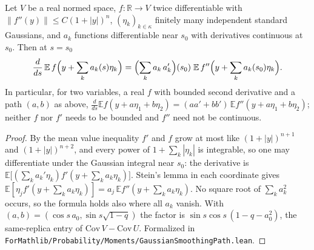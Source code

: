 \begin{lemma}\label{lem:sg-tal:perceptron-smoothing-path}
  \leanok
Let $V$ be a real normed space, $f:\mathbb R\to V$ twice differentiable with $\|f''(y)\|\le C(1+|y|)^n$,
$(\eta_k)_{k\in\kappa}$ finitely many independent standard Gaussians, and $a_k$ functions differentiable near $s_0$
with derivatives continuous at $s_0$. Then at $s=s_0$
\[
 \frac d{ds}\,\mathbb E\,f\Bigl(y+\sum_ka_k(s)\eta_k\Bigr)
 =\Bigl(\sum_ka_k\,a_k'\Bigr)(s_0)\;\mathbb E\,f''\Bigl(y+\sum_ka_k(s_0)\eta_k\Bigr).
\]
In particular, for two variables, a real $f$ with bounded second derivative and a path $(a,b)$ as above,
$\frac d{ds}\mathbb Ef(y+a\eta_1+b\eta_2)=(aa'+bb')\,\mathbb Ef''(y+a\eta_1+b\eta_2)$; neither $f$ nor $f'$ needs to
be bounded and $f''$ need not be continuous.
\end{lemma}
\begin{proof}
  \leanok
By the mean value inequality $f'$ and $f$ grow at most like $(1+|y|)^{n+1}$ and $(1+|y|)^{n+2}$, and every power of
$1+\sum_k|\eta_k|$ is integrable, so one may differentiate under the Gaussian integral near $s_0$:
the derivative is $\mathbb E\bigl[(\sum_ka_k'\eta_k)f'(y+\sum_ka_k\eta_k)\bigr]$. Stein's lemma in each coordinate
gives $\mathbb E[\eta_jf'(y+\sum_ka_k\eta_k)]=a_j\,\mathbb Ef''(y+\sum_ka_k\eta_k)$. No square root of $\sum_ka_k^2$
occurs, so the formula holds also where all $a_k$ vanish. With $(a,b)=(\cos s\,a_0,\sin s\sqrt{1-q})$ the factor is
$\sin s\cos s\,(1-q-a_0^2)$, the same-replica entry of $\mathrm{Cov}\,V-\mathrm{Cov}\,U$.
Formalized in \texttt{ForMathlib/Probability/Moments/GaussianSmoothingPath.lean}.
\end{proof}

